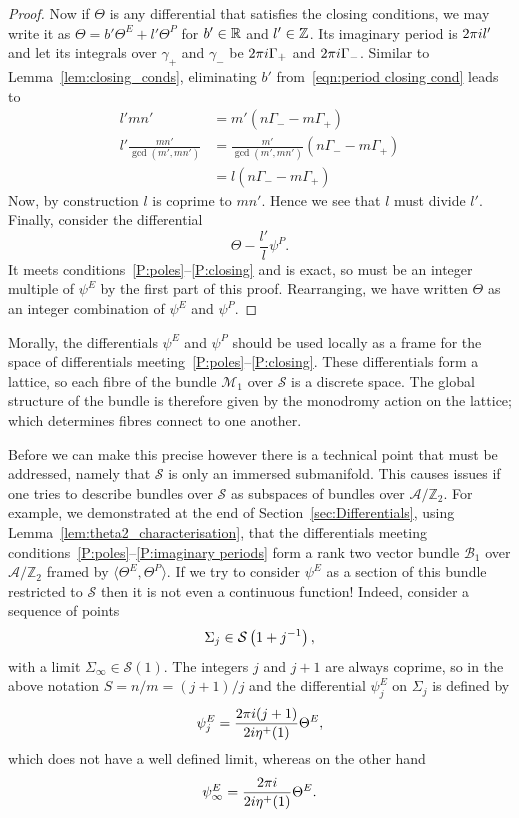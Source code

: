 \documentclass{article}
\begin{document}
\begin{lem}
\begin{proof}
Now if $\Theta$ is any differential that satisfies the closing conditions, we may write it as $\Theta = b'\Theta^E + l'\Theta^P$ for $b'\in\mathbb{R}$ and $l'\in \mathbb{Z}$. Its imaginary period is $2\pi i l'$ and let its integrals over $\gamma_+$ and $\gamma_-$ be $2\pi i \Gamma_+$ and $2\pi i \Gamma_-$. Similar to Lemma~\ref{lem:closing_conds}, eliminating $b'$ from~\eqref{eqn:period closing cond} leads to
\begin{align*}
l'mn' &= m'(n\Gamma_- - m\Gamma_+) \\
l'\frac{mn'}{\gcd(m',mn')} &= \frac{m'}{\gcd(m',mn')}(n\Gamma_- - m\Gamma_+) \\
&= l(n\Gamma_- - m\Gamma_+)
\end{align*}
Now, by construction $l$ is coprime to $mn'$. Hence we see that $l$ must divide $l'$. Finally, consider the differential
\[
\Theta - \frac{l'}{l}\psi^P.
\]
It meets conditions~\ref{P:poles}--\ref{P:closing} and is exact, so must be an integer multiple of $\psi^E$ by the first part of this proof. Rearranging, we have written $\Theta$ as an integer combination of $\psi^E$ and $\psi^P$.
\end{proof}
\end{lem}

Morally, the differentials $\psi^E$ and $\psi^P$ should be used locally as a frame for the space of differentials meeting~\ref{P:poles}--\ref{P:closing}. These differentials form a lattice, so each fibre of the bundle $\mathcal{M}_1$ over $\mathcal{S}$ is a discrete space. The global structure of the bundle is therefore given by the monodromy action on the lattice; which determines fibres connect to one another.

Before we can make this precise however there is a technical point that must be addressed, namely that $\mathcal{S}$ is only an immersed submanifold.
This causes issues if one tries to describe bundles over $\mathcal{S}$ as subspaces of bundles over $\mathcal{A}/\mathbb{Z}_2$.
For example, we demonstrated at the end of Section~\ref{sec:Differentials}, using Lemma~\ref{lem:theta2_characterisation}, that the differentials meeting conditions~\ref{P:poles}--\ref{P:imaginary periods} form a rank two vector bundle $\mathcal{B}_1$ over $\mathcal{A}/\mathbb{Z}_2$ framed by $\langle \Theta^E,\Theta^P \rangle$.
If we try to consider $\psi^E$ as a section of this bundle restricted to $\mathcal{S}$ then it is not even a continuous function!
Indeed, consider a sequence of points
\[
\Sigma_j \in \mathcal{S}\left(1+j^{-1}\right),
\]
with a limit $\Sigma_\infty \in \mathcal{S}(1)$. The integers $j$ and $j+1$ are always coprime, so in the above notation $S = n/m = (j+1)/j$ and the differential $\psi^E_j$ on $\Sigma_j$ is defined by
\[
\psi^E_j = \frac{2\pi i (j+1)}{2i \eta^+(1)} \Theta^E,
\]
which does not have a well defined limit, whereas on the other hand
\[
\psi^E_\infty = \frac{2\pi i}{2i \eta^+(1)} \Theta^E.
\]
\end{document}
